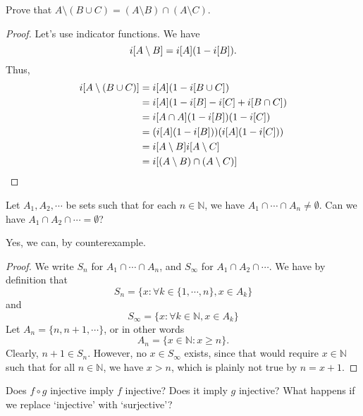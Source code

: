 \documentclass[12pt]{article}
\begin{document}
\begin{question}
    Prove that $A \setminus (B \cup C) = (A \setminus B) \cap (A \setminus C)$.
\end{question}
\begin{proof}
    Let's use indicator functions. We have
    \[
        i[A \setminus B] = i[A] (1 - i[B]).
    \]
    Thus,
    \begin{align*}
        i[A \setminus (B \cup C)]
            &= i[A] (1 - i[B \cup C])\\
            &= i[A] (1 - i[B] - i[C] + i[B \cap C])\\
            &= i[A \cap A] (1 - i[B])(1 - i[C])\\
            &= (i[A](1 - i[B]))(i[A](1 - i[C]))\\
            &= i[A \setminus B] i[A \setminus C]\\
            &= i[(A \setminus B) \cap (A \setminus C)]
    \end{align*}
\end{proof}

\begin{question}
    Let $A_{1},A_{2},\cdots$ be sets such that
    for each $n \in \mathbb{N}$, we have $A_{1} \cap \cdots \cap A_n \ne \emptyset$.
    Can we have $A_{1} \cap A_{2} \cap \cdots = \emptyset$?
\end{question}
Yes, we can, by counterexample.
\begin{proof}
    We write $S_n$ for $A_{1} \cap \cdots \cap A_n$,
    and $S_\infty$ for $A_{1} \cap A_{2} \cap \cdots$.
    We have by definition that 
    \[
    S_n = \{x : \forall k \in \{1,\cdots,n\},x \in A_k\}
    \]
    and
    \[
    S_\infty = \{x : \forall k \in \mathbb{N},x \in A_k\}
    \]
    Let $A_n = \{n,n+1,\cdots\}$, or in other words
    \[
    A_n = \{x \in \mathbb{N} : x \ge n\}.
    \]
    Clearly, $n + 1 \in S_n$.
    However, no $x \in S_\infty$ exists, since that would require
    $x \in \mathbb{N}$ such that for all $n \in \mathbb{N}$,
    we have $x > n$, which is plainly not true by $n = x + 1$.
\end{proof}

\begin{question}
    Does $f \circ g$ injective imply $f$ injective?
    Does it imply $g$ injective?
    What happens if we replace \lq{}injective\rq{} with \lq{}surjective\rq{}?
\end{question}
\end{document}

